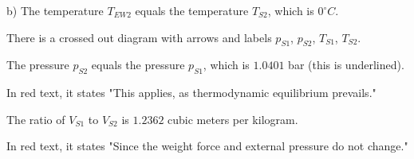 b) The temperature \( T_{EW2} \) equals the temperature \( T_{S2} \), which is \( 0^\circ C \).

There is a crossed out diagram with arrows and labels \( p_{S1} \), \( p_{S2} \), \( T_{S1} \), \( T_{S2} \).

The pressure \( p_{S2} \) equals the pressure \( p_{S1} \), which is \( 1.0401 \) bar (this is underlined).

In red text, it states "This applies, as thermodynamic equilibrium prevails."

The ratio of \( V_{S1} \) to \( V_{S2} \) is \( 1.2362 \) cubic meters per kilogram.

In red text, it states "Since the weight force and external pressure do not change."